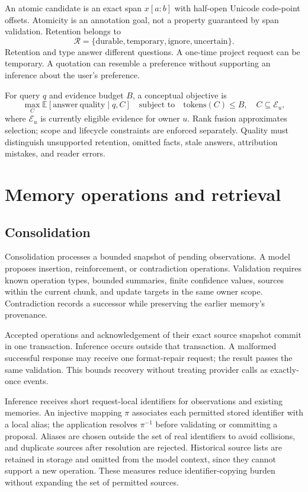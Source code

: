\documentclass[11pt]{article}
\newcommand{\E}{\mathbb{E}}
\begin{document}
An atomic candidate is an exact span $x[a:b]$ with half-open Unicode code-point offsets. Atomicity is an annotation goal, not a property guaranteed by span validation. Retention belongs to
\[
 \mathcal{R}=\{\text{durable},\text{temporary},\text{ignore},\text{uncertain}\}.
\]
Retention and type answer different questions. A one-time project request can be temporary. A quotation can resemble a preference without supporting an inference about the user's preference.

For query $q$ and evidence budget $B$, a conceptual objective is
\[
 \max_C \E[\mathrm{answer\ quality}\mid q,C]
 \quad\text{subject to}\quad
 \mathrm{tokens}(C)\leq B,\quad C\subseteq\mathcal{E}_u,
\]
where $\mathcal{E}_u$ is currently eligible evidence for owner $u$. Rank fusion approximates selection; scope and lifecycle constraints are enforced separately. Quality must distinguish unsupported retention, omitted facts, stale answers, attribution mistakes, and reader errors.

\section{Memory operations and retrieval}
\subsection{Consolidation}
Consolidation processes a bounded snapshot of pending observations. A model proposes insertion, reinforcement, or contradiction operations. Validation requires known operation types, bounded summaries, finite confidence values, sources within the current chunk, and update targets in the same owner scope. Contradiction records a successor while preserving the earlier memory's provenance.

Accepted operations and acknowledgement of their exact source snapshot commit in one transaction. Inference occurs outside that transaction. A malformed successful response may receive one format-repair request; the result passes the same validation. This bounds recovery without treating provider calls as exactly-once events.

Inference receives short request-local identifiers for observations and existing memories. An injective mapping $\pi$ associates each permitted stored identifier with a local alias; the application resolves $\pi^{-1}$ before validating or committing a proposal. Aliases are chosen outside the set of real identifiers to avoid collisions, and duplicate sources after resolution are rejected. Historical source lists are retained in storage and omitted from the model context, since they cannot support a new operation. These measures reduce identifier-copying burden without expanding the set of permitted sources.
\end{document}
